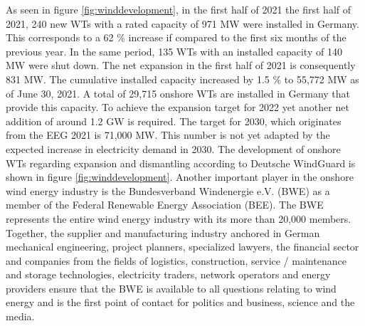 \documentclass[a4paper,11pt]{article}
\begin{document}
As seen in figure \ref{fig:winddevelopment}, in the first half of 2021 the first half of 2021, 240 new WTs with a rated capacity of 971 MW were installed in Germany. This corresponds to a 62 \% increase if compared to the first six months of the previous year. In the same period, 135 WTs with an installed capacity of 140 MW were shut down. The net expansion in the first half of 2021 is consequently 831 MW. The cumulative installed capacity increased by 1.5 \% to 55,772 MW as of June 30, 2021. A total of 29,715 onshore WTs are installed in Germany that provide this capacity. To achieve the expansion target for 2022 yet another net addition of around 1.2 GW is required. The target for 2030, which originates from the EEG 2021 is 71,000 MW. This number is not yet adapted by the expected increase in electricity demand in 2030. The development of onshore WTs regarding expansion and dismantling according to Deutsche WindGuard is shown in figure \ref{fig:winddevelopment}. Another important player in the onshore wind energy industry is the Bundesverband Windenergie e.V. (BWE) as a member of the Federal Renewable Energy Association (BEE). The BWE represents the entire wind energy industry with its more than 20,000 members. Together, the supplier and manufacturing industry anchored in German mechanical engineering, project planners, specialized lawyers, the financial sector and companies from the fields of logistics, construction, service / maintenance and storage technologies, electricity traders, network operators and energy providers ensure that the BWE is available to all questions relating to wind energy and is the first point of contact for politics and business, science and the media.
\end{document}
